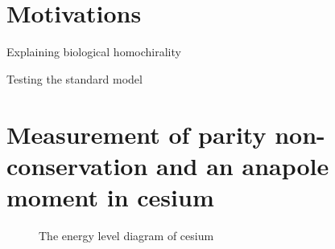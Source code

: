 \documentclass[10pt]{beamer}
\begin{document}
\section{Motivations}

\begin{frame}{Explaining biological homochirality}



\end{frame}


\begin{frame}{Testing the standard model}
	

\end{frame}


\section{Measurement of parity non-conservation and an anapole moment in cesium}

\begin{frame}
	

	\begin{figure}[h!]
		\centering
		\caption{The energy level diagram of cesium}
		\label{fig:cs}
	\end{figure}

	

\end{frame}
\end{document}
